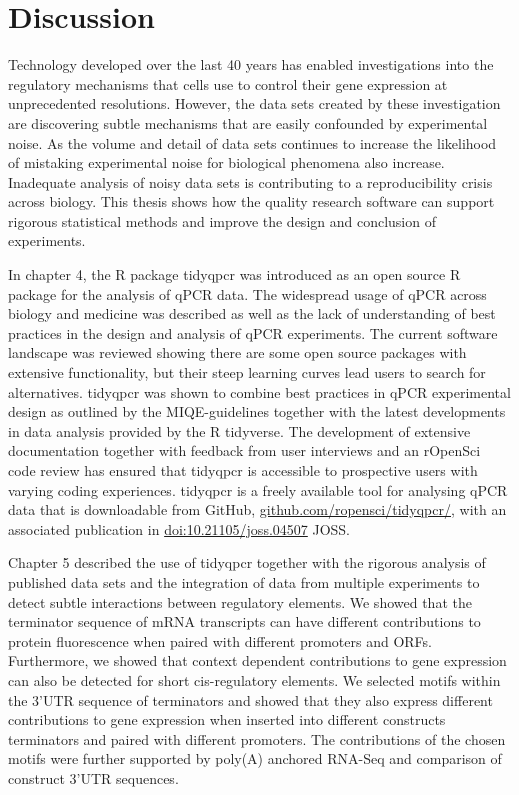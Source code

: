 \documentclass[../main.tex]{subfiles}
\begin{document}
\chapter{{Discussion}}
\onehalfspacing

Technology developed over the last 40 years has enabled investigations into the regulatory mechanisms that cells use to control their gene expression at unprecedented resolutions.
However, the data sets created by these investigation are discovering subtle mechanisms that are easily confounded by experimental noise.
As the volume and detail of data sets continues to increase the likelihood of mistaking experimental noise for biological phenomena also increase.
Inadequate analysis of noisy data sets is contributing to a reproducibility crisis across biology.
This thesis shows how the quality research software can support rigorous statistical methods and improve the design and conclusion of experiments.

In chapter 4, the R package tidyqpcr was introduced as an open source R package for the analysis of qPCR data. 
The widespread usage of qPCR across biology and medicine was described as well as the lack of understanding of best practices in the design and analysis of qPCR experiments.
The current software landscape was reviewed showing there are some open source packages with extensive functionality, but their steep learning curves lead users to search for alternatives.
tidyqpcr was shown to combine best practices in qPCR experimental design as outlined by the MIQE-guidelines together with the latest developments in data analysis provided by the R tidyverse.
The development of extensive documentation together with feedback from user interviews and an rOpenSci code review has ensured that tidyqpcr is accessible to prospective users with varying coding experiences. 
tidyqpcr is a freely available tool for analysing qPCR data that is downloadable from GitHub, \href{https://github.com/ropensci/tidyqpcr/}{github.com/ropensci/tidyqpcr/}, with an associated publication in \href{https://joss.theoj.org/papers/10.21105/joss.04507}{doi:10.21105/joss.04507} JOSS.

Chapter 5 described the use of tidyqpcr together with the rigorous analysis of published data sets and the integration of data from multiple experiments to detect subtle interactions between regulatory elements.
We showed that the terminator sequence of mRNA transcripts can have different contributions to protein fluorescence when paired with different promoters and ORFs.
Furthermore, we showed that context dependent contributions to gene expression can also be detected for short cis-regulatory elements.
We selected motifs within the 3'UTR sequence of terminators and showed that they also express different contributions to gene expression when inserted into different constructs terminators and paired with different promoters.
The contributions of the chosen motifs were further supported by poly(A) anchored RNA-Seq and comparison of construct 3'UTR sequences.
\end{document}
